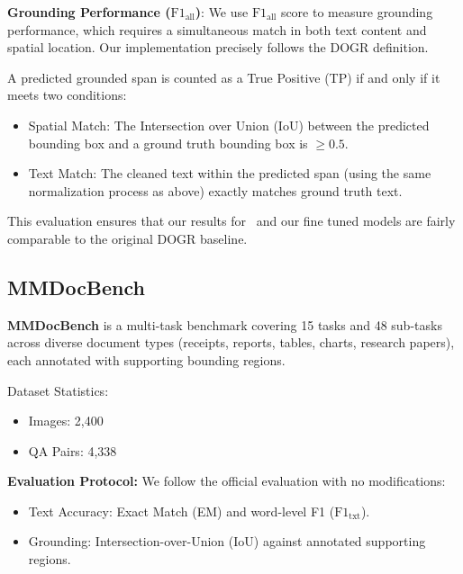 \noindent \textbf{Grounding Performance ($\text{F1}_{\text{all}}$)}:
We use $\text{F1}_{\text{all}}$ score to measure grounding performance, which requires a simultaneous match in both text content and spatial location. Our implementation precisely follows the DOGR \cite{zhou2025dogr} definition.

A predicted grounded span is counted as a True Positive (TP) if and only if it meets two conditions:
\begin{itemize}
    \item Spatial Match: The Intersection over Union (IoU) between the predicted bounding box and a ground truth bounding box is $\geq 0.5$.
    \item Text Match: The cleaned text within the predicted span (using the same normalization process as above) exactly matches ground truth text.
\end{itemize}

\noindent This evaluation ensures that our results for \modelName\ and our fine tuned models are fairly comparable to the original DOGR baseline.




\subsection{MMDocBench}
\label{sec:dataset_mmdocbench}
\textbf{MMDocBench} \cite{zhu2024mmdocbench} is a  multi-task benchmark covering 15 tasks and 48 sub-tasks across diverse document types (receipts, reports, tables, charts, research papers), each annotated with supporting bounding regions.

\noindent Dataset Statistics: 
\begin{itemize}
    \item Images: 2,400  
    \item QA Pairs: 4,338
\end{itemize}

\noindent\textbf{Evaluation Protocol:}  
We follow the official evaluation with no modifications:
\begin{itemize}
    \item Text Accuracy: Exact Match (EM) and word-level F1 ($\text{F1}_{\text{txt}}$).
    \item Grounding: Intersection-over-Union (IoU) against annotated supporting regions.
\end{itemize}



\subsection{\benchmarkName}
\label{sec:benchmark}

